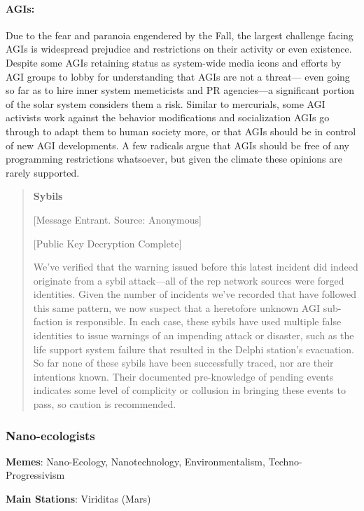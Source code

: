 \paragraph{AGIs:} Due to the fear and paranoia engendered by the Fall, the largest challenge facing AGIs is widespread prejudice and restrictions on their activity or even existence. Despite some AGIs retaining status as system-wide media icons and efforts by AGI groups to lobby for understanding that AGIs are not a threat— even going so far as to hire inner system memeticists and PR agencies—a significant portion of the solar system considers them a risk. Similar to mercurials, some AGI activists work against the behavior modifications and socialization AGIs go through to adapt them to human society more, or that AGIs should be in control of new AGI developments. A few radicals argue that AGIs should be free of any programming restrictions whatsoever, but given the climate these opinions are rarely supported. 

\begin{quotation} \textbf{Sybils} 

[Message Entrant. Source: Anonymous] 

[Public Key Decryption Complete] 

We’ve verified that the warning issued before this latest incident did indeed originate from a sybil attack—all of the rep network sources were forged identities. Given the number of incidents we’ve recorded that have followed this same pattern, we now suspect that a heretofore unknown AGI sub-faction is responsible. In each case, these sybils have used multiple false identities to issue warnings of an impending attack or disaster, such as the life support system failure that resulted in the Delphi station’s evacuation. So far none of these sybils have been successfully traced, nor are their intentions known. Their documented pre-knowledge of pending events indicates some level of complicity or collusion in bringing these events to pass, so caution is recommended. \end{quotation} 

\subsubsection{Nano-ecologists} \label{sec:nano-ecologists} 

\textbf{Memes}: Nano-Ecology, Nanotechnology, Environmentalism, Techno-Progressivism 

\textbf{Main Stations}: Viriditas (Mars) 

